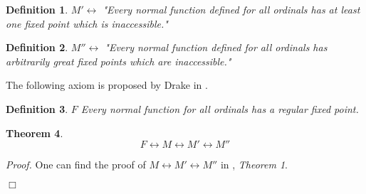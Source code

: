 \documentclass[12pt,a4paper]{article}
\newtheorem{theorem}{Theorem}[section]
\newtheorem{definition}[theorem]{Definition}
\newenvironment{proof}
{\noindent \textit{Proof.}}
{\hspace*{\fill} $\Box$}
\renewcommand{\iff}{\leftrightarrow}
\newcommand{\then}{\rightarrow}
\begin{document}
\begin{}

\begin{definition}
$M' \iff $ "Every normal function defined for all ordinals has at least one fixed point which is inaccessible."
\end{definition}

\begin{definition}
$M'' \iff $ "Every normal function defined for all ordinals has arbitrarily great fixed points which are inaccessible."
\end{definition}


The following axiom is proposed by Drake in \cite{DrakeBook}. 
\begin{definition}{$F$}
Every normal function for all ordinals has a regular fixed point.
\end{definition}

\begin{theorem}
\begin{equation}
F \iff M \iff M' \iff M''
\end{equation}
\end{theorem}

\begin{proof}
One can find the proof of $M \iff M' \iff M''$ in \cite{Levy60a}, \emph{Theorem 1}. %




\end{proof}
\end{}
\end{document}

